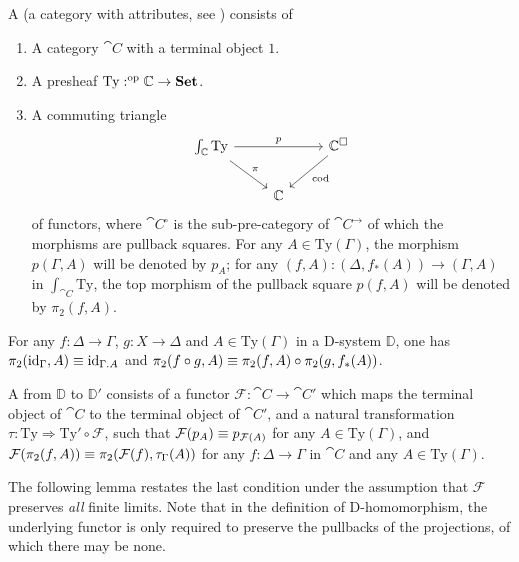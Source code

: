 \begin{defn}
A  (a category with attributes, see \cite{Hofmann_syntax_semantics}) consists of
\begin{enumerate}
\item A category $\cat{C}$ with a terminal object $1$.
\item A presheaf $\mathrm{Ty}:^{\mathrm{op}}{\mathbb{C}}\to\mathbf{Set}$. 
\item A commuting triangle
\begin{equation*}
\begin{tikzcd}
\int_{\cat{C}}\mathrm{Ty} \arrow[rr,"p"] \arrow[dr,"\pi"] & & \cat{C}^\square \arrow[dl,"\mathrm{cod}"] \\
& \cat{C}
\end{tikzcd}
\end{equation*}
of functors, where $\cat{C}^\square$ is the sub-pre-category of $\cat{C}^{\to}$ of
which the morphisms are pullback squares. For any $A\in\mathrm{Ty}(\Gamma)$,
the morphism $p(\Gamma,A)$ will be denoted by $p_A$; for any
$(f,A):(\Delta,f_\ast(A))\to(\Gamma,A)$ in $\int_{\cat{C}}\mathrm{Ty}$, the top
morphism of the pullback square $p(f,A)$ will be denoted by $\pi_2(f,A)$.
\end{enumerate}
\end{defn}

\begin{rmk}
For any $f:\Delta\to\Gamma$, $g:X\to\Delta$ and $A\in\mathrm{Ty}(\Gamma)$ in a
D-system $\mathbb{D}$, one has 
$\pi_2(\catid{\Gamma},A)\jdeq\catid{\ctxext{\Gamma}{A}}$ and
$\pi_2(f\circ g,A)\equiv \pi_2(f,A)\circ\pi_2(g,f_\ast(A))$.
\end{rmk}

\begin{defn}
A  from $\mathbb{D}$ to $\mathbb{D}'$ consists of a functor 
$\mathcal{F}:\cat{C}\to\cat{C}'$ which maps the terminal object of
$\cat{C}$ to the terminal object of $\cat{C}'$, and a natural transformation
$\tau:\mathrm{Ty}\Rightarrow\mathrm{Ty}'\circ\mathcal{F}$, such that 
$\mathcal{F}(p_A)\equiv p_{\mathcal{F}(A)}$ for any
$A\in\mathrm{Ty}(\Gamma)$, and $\mathcal{F}(\pi_2(f,A))\equiv
\pi_2(\mathcal{F}(f),\tau_\Gamma(A))$ for any $f:\Delta\to\Gamma$ in $\cat{C}$ and
any $A\in\mathrm{Ty}(\Gamma)$. 
\end{defn}

The following lemma restates the last condition under the assumption that
$\mathcal{F}$ preserves \emph{all} finite limits. Note that
in the definition of D-homomorphism, the underlying functor is only
required to preserve the pullbacks of the projections, of which there may be
none.

